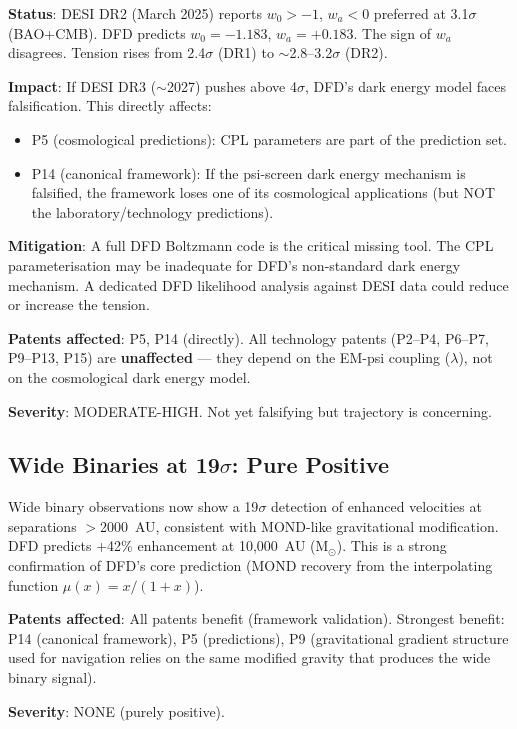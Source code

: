 \documentclass[11pt]{article}
\begin{document}
\begin{tcolorbox}[colback=red!5!white, colframe=red!60!black,
  title=\textbf{RISK: DESI CPL Tension (W4i10 Cosmo)}]

\textbf{Status}: DESI DR2 (March 2025) reports $w_0 > -1$, $w_a < 0$
preferred at 3.1$\sigma$ (BAO+CMB). DFD predicts $w_0 = -1.183$,
$w_a = +0.183$. The sign of $w_a$ disagrees. Tension rises from
2.4$\sigma$ (DR1) to $\sim$2.8--3.2$\sigma$ (DR2).

\textbf{Impact}: If DESI DR3 ($\sim$2027) pushes above 4$\sigma$, DFD's
dark energy model faces falsification. This directly affects:
\begin{itemize}[nosep]
  \item P5 (cosmological predictions): CPL parameters are part of the
    prediction set.
  \item P14 (canonical framework): If the psi-screen dark energy mechanism
    is falsified, the framework loses one of its cosmological applications
    (but NOT the laboratory/technology predictions).
\end{itemize}

\textbf{Mitigation}: A full DFD Boltzmann code is the critical missing tool.
The CPL parameterisation may be inadequate for DFD's non-standard dark
energy mechanism. A dedicated DFD likelihood analysis against DESI data
could reduce or increase the tension.

\textbf{Patents affected}: P5, P14 (directly). All technology patents
(P2--P4, P6--P7, P9--P13, P15) are \textbf{unaffected} --- they depend on
the EM-psi coupling ($\lambda$), not on the cosmological dark energy model.

\textbf{Severity}: MODERATE-HIGH. Not yet falsifying but trajectory is
concerning.
\end{tcolorbox}

\subsection{Wide Binaries at 19$\sigma$: Pure Positive}

\begin{tcolorbox}[colback=green!5!white, colframe=green!60!black,
  title=\textbf{POSITIVE: Wide Binary Enhancement Confirmed}]

Wide binary observations now show a 19$\sigma$ detection of enhanced
velocities at separations $>$2000~AU, consistent with MOND-like
gravitational modification. DFD predicts +42\% enhancement at 10,000~AU
(M$_\odot$). This is a strong confirmation of DFD's core prediction
(MOND recovery from the interpolating function $\mu(x) = x/(1+x)$).

\textbf{Patents affected}: All patents benefit (framework validation).
Strongest benefit: P14 (canonical framework), P5 (predictions), P9
(gravitational gradient structure used for navigation relies on the
same modified gravity that produces the wide binary signal).

\textbf{Severity}: NONE (purely positive).
\end{tcolorbox}
\end{document}
